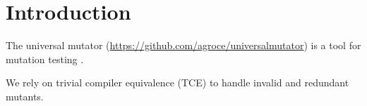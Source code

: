 \section{Introduction}

The universal mutator (\url{https://github.com/agroce/universalmutator}) is a tool for mutation testing \cite{PracProg,Mut2000}.  

We rely on trivial compiler equivalence (TCE) \cite{TCE} to handle invalid and redundant mutants.
